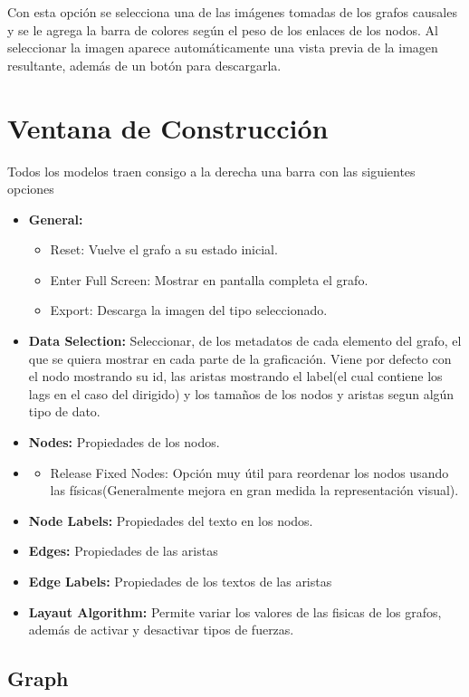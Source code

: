 \documentclass[spanish]{article}
\begin{document}
Con esta opción se selecciona una de las imágenes tomadas de los grafos causales y se le agrega la barra de colores según el peso de los enlaces de los nodos. Al seleccionar la imagen aparece automáticamente una vista previa de la imagen resultante, además de un botón para descargarla.


\section*{Ventana de Construcción}

Todos los modelos traen consigo a la derecha una barra con las siguientes opciones

\begin{itemize}
    \item \textbf{General:}
    \begin{itemize}
        \item Reset: Vuelve el grafo a su estado inicial.
        \item Enter Full Screen: Mostrar en pantalla completa el grafo.
        \item Export: Descarga la imagen del tipo seleccionado.
    \end{itemize}
    \item \textbf{Data Selection:} Seleccionar, de los metadatos de cada elemento del grafo, el que se quiera mostrar en cada parte de la graficación. Viene por defecto con el nodo mostrando su id, las aristas mostrando el label(el cual contiene los lags en el caso del dirigido) y los tamaños de los nodos y aristas segun algún tipo de dato.
    \item \textbf{Nodes:} Propiedades de los nodos.
    \item \begin{itemize}
        \item Release Fixed Nodes: Opción muy útil para reordenar los nodos usando las físicas(Generalmente mejora en gran medida la representación visual).
    \end{itemize}
    \item \textbf{Node Labels:} Propiedades del texto en los nodos.
    \item \textbf{Edges:} Propiedades de las aristas
    \item \textbf{Edge Labels:} Propiedades de los textos de las aristas
    \item \textbf{Layaut Algorithm:} Permite variar los valores de las fisicas de los grafos, además de activar y desactivar tipos de fuerzas.
\end{itemize}

\subsection*{Graph}
\end{document}

